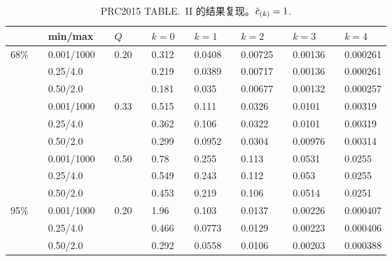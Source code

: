 
\begin{table}
  \renewcommand\arraystretch{1.0} %
  \caption{PRC2015 TABLE.~II 的结果复现。$\dmscbar_{(k)}=1$.}
  \label{tab:tab2}
  \centering
  \begin{tabular}{*{15}{l}}
    \toprule\hline
    &\quad& min/max &\quad& $Q$ &\quad& $k=0$ &\quad& $k=1$
    &\quad& $k=2$ &\quad& $k=3$ &\quad& $k=4$ \\

    \hline
    \multirow{9}{*}{68\%}

    && 0.001/1000 &&
    \multirow{3}{*}{0.20} &&
	0.312 && 0.0408 && 0.00725 && 0.00136 && 0.000261
    \\
    && 0.25/4.0 &&
    &&
	0.219 && 0.0389 && 0.00717 && 0.00136 && 0.000261
    \\
    && 0.50/2.0 &&
    &&
	0.181 && 0.035 && 0.00677 && 0.00132 && 0.000257
    \\
    \cline{2-15}

    && 0.001/1000 &&
    \multirow{3}{*}{0.33} &&
	0.515 && 0.111 && 0.0326 && 0.0101 && 0.00319
    \\
    && 0.25/4.0 &&
    &&
	0.362 && 0.106 && 0.0322 && 0.0101 && 0.00319
    \\
    && 0.50/2.0 &&
    &&
	0.299 && 0.0952 && 0.0304 && 0.00976 && 0.00314
    \\
    \cline{2-15}
    
    && 0.001/1000 &&
    \multirow{3}{*}{0.50} &&
	0.78 && 0.255 && 0.113 && 0.0531 && 0.0255
    \\
    && 0.25/4.0 &&
    &&
	0.549 && 0.243 && 0.112 && 0.053 && 0.0255
    \\
    && 0.50/2.0 &&
    &&
	0.453 && 0.219 && 0.106 && 0.0514 && 0.0251
    \\
    \cline{2-15}

    \hline
    \multirow{9}{*}{95\%}

    && 0.001/1000 &&
    \multirow{3}{*}{0.20} &&
	1.96 && 0.103 && 0.0137 && 0.00226 && 0.000407
    \\
    && 0.25/4.0 &&
    &&
	0.466 && 0.0773 && 0.0129 && 0.00223 && 0.000406
    \\
    && 0.50/2.0 &&
    &&
	0.292 && 0.0558 && 0.0106 && 0.00203 && 0.000388
    \\
    \cline{2-15}


\end{tabular}
\end{table}
